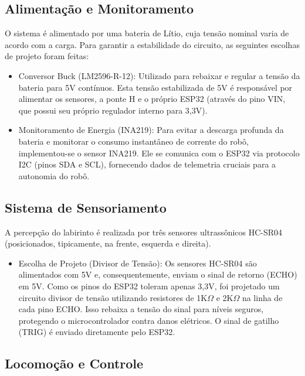 \subsection{Alimentação e Monitoramento}

    O sistema é alimentado por uma bateria de Lítio, cuja tensão nominal varia de acordo com a carga. 
    Para garantir a estabilidade do circuito, as seguintes escolhas de projeto foram feitas:
    
    \begin{itemize}
        \item Conversor Buck (LM2596-R-12): Utilizado para rebaixar e regular a tensão da bateria para 5V contínuos. 
        Esta tensão estabilizada de 5V é responsável por alimentar os sensores, a ponte H e o próprio ESP32 (através do pino VIN, que possui seu próprio regulador interno para 3,3V).
        \item Monitoramento de Energia (INA219): Para evitar a descarga profunda da bateria e monitorar o consumo instantâneo de corrente do robô, implementou-se o sensor INA219. 
        Ele se comunica com o ESP32 via protocolo I2C (pinos SDA e SCL), fornecendo dados de telemetria cruciais para a autonomia do robô.
    \end{itemize}

\subsection{Sistema de Sensoriamento}

    A percepção do labirinto é realizada por três sensores ultrassônicos HC-SR04 (posicionados, tipicamente, na frente, esquerda e direita).

    \begin{itemize}
        \item Escolha de Projeto (Divisor de Tensão): Os sensores HC-SR04 são alimentados com 5V e, consequentemente, enviam o sinal de retorno (ECHO) em 5V. 
        Como os pinos do ESP32 toleram apenas 3,3V, foi projetado um circuito divisor de tensão utilizando resistores de 1K$ \Omega $ e 2K$ \Omega $ na linha de cada pino ECHO. 
        Isso rebaixa a tensão do sinal para níveis seguros, protegendo o microcontrolador contra danos elétricos. 
        O sinal de gatilho (TRIG) é enviado diretamente pelo ESP32.
    \end{itemize}

\subsection{Locomoção e Controle}

